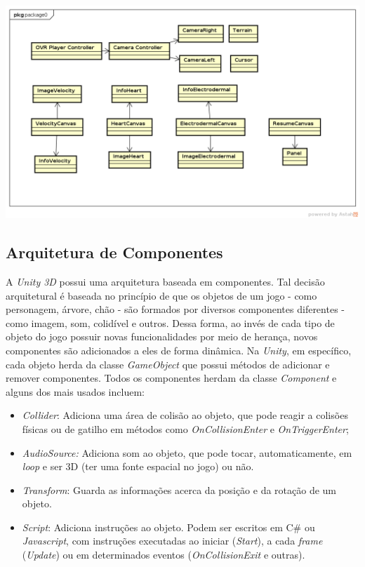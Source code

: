 \begin{center}
	\includegraphics[scale=0.5]{figuras/statistics}
	\label{figura:statistics}
\end{center}

\subsection{Arquitetura de Componentes}

A \textit{Unity 3D} possui uma arquitetura baseada em componentes. Tal decisão arquitetural é baseada no princípio de que os objetos de um jogo - como personagem, árvore, chão - são formados por diversos componentes diferentes - como imagem, som, colidível e outros. Dessa forma, ao invés de cada tipo de objeto do jogo possuir novas funcionalidades por meio de herança, novos componentes são adicionados a eles de forma dinâmica. Na \textit{Unity}, em específico, cada objeto herda da classe \textit{GameObject} que possui métodos de adicionar e remover componentes. Todos os componentes herdam da classe \textit{Component} e alguns dos mais usados incluem:

\begin{itemize}
\item \textit{Collider}: Adiciona uma área de colisão ao objeto, que pode reagir a colisões físicas ou de gatilho em métodos como \textit{OnCollisionEnter} e \textit{OnTriggerEnter};
\item \textit{AudioSource:} Adiciona som ao objeto, que pode tocar, automaticamente, em \textit{loop} e ser 3D (ter uma fonte espacial no jogo) ou não.
\item \textit{Transform}: Guarda as informações acerca da posição e da rotação de um objeto.
\item \textit{Script}: Adiciona instruções ao objeto. Podem ser escritos em C\# ou \textit{Javascript}, com instruções executadas ao iniciar (\textit{Start}), a cada \textit{frame} (\textit{Update}) ou em determinados eventos (\textit{OnCollisionExit} e outras).
\end{itemize}

